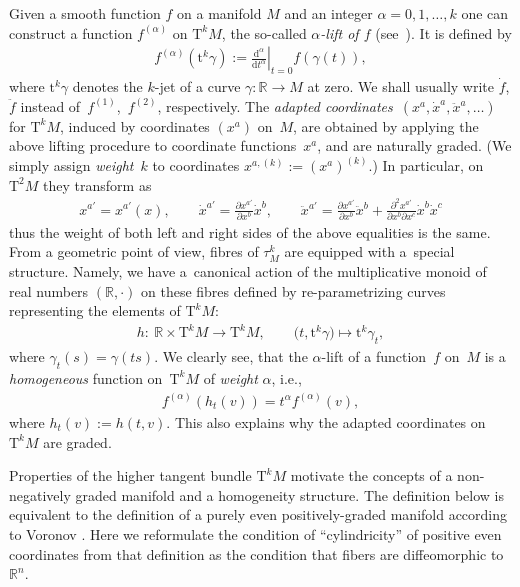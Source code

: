\documentclass[10pt,a4paper]{amsart}
\newcommand{\R}{\mathbb{R}}
\newcommand{\pa}{\partial}
\newcommand{\dd}{\mathrm{d}}
\newcommand{\ra}{\rightarrow}
\newcommand{\TT}[1]{\mathrm{T}^{#1}} %
\newcommand{\tclass}[2]{\bm{\mathrm{t}}^{#1}#2} %
\numberwithin{equation}{section}
\theoremstyle{definition}
\begin{document}
Given a smooth function $f$ on a manifold $M$ and an integer $\alpha=0,1,\hdots,k$ one can construct a function $f^{(\alpha)}$ on $\TT k M$, the so-called \emph{$\alpha$-lift of $f$} (see~\cite{Morimoto_Lifts}). It is defined by
\begin{gather*}
f^{(\alpha)}(\tclass{k}{\gamma}):= \left.\frac{\dd^\alpha}{\dd t^\alpha}\right|_{t=0} f(\gamma(t)),
\end{gather*}
where $\tclass{k}{\gamma}$ denotes the $k$-{jet} of a curve $\gamma\colon \R \ra M$ at zero. We shall usually write $\dot{f}$, $\ddot{f}$ instead of~$f^{(1)}$,~$f^{(2)}$, respectively. The \emph{adapted coordinates}~$(x^{a}, \dot{x}^a, \ddot{x}^a, \ldots)$ for $\TT{k} M$, induced by coordinates $(x^a)$ on~$M$, are obtained by applying the above lifting procedure to coordinate functions~$x^a$, and are naturally graded. (We simply assign \emph{weight}~$k$ to coordinates \mbox{$x^{a, (k)} := (x^a)^{(k)}$}.) In particular, on $\TT{2} M$ they transform as
\begin{gather}\label{e:T2M}
x^{a'}=x^{a'}(x), \qquad \dot{x}^{a'} = \frac{\partial x^{a'}}{\pa x^b} \dot{x}^b, \qquad
\ddot{x}^{a'} = \frac{\pa x^{a'}}{\pa x^b} \ddot{x}^b + \frac{\pa^2 x^{a'}}{\pa x^b\pa x^c}\dot{x}^b \dot{x}^c
\end{gather}
thus the weight of both left and right sides of the above equalities is the same. From a geo\-metric point of view, fibres of $\tau^k_M$ are equipped with a~special structure. Namely, we have a~canonical action of the multiplicative monoid of real numbers $(\R, \cdot)$ on these fibres defined by re-parametrizing curves representing the elements of $\TT{k} M$:
\begin{gather*}
h\colon \ \R \times \TT{k} M \ra \TT{k} M, \qquad \big(t, \tclass{k}{\gamma}\big) \mapsto \tclass{k}{\gamma_t},
\end{gather*}
where $\gamma_t(s)=\gamma(ts)$. We clearly see, that the $\alpha$-lift of a function~$f$ on~$M$ is a \emph{homogeneous} function on~$\TT{k} M$ of \emph{weight} $\alpha$, i.e.,{\samepage
\begin{gather*}
f^{(\alpha)}(h_t(v)) = t^\alpha f^{(\alpha)}(v),
\end{gather*}
where $h_t(v) := h(t, v)$. This also explains why the adapted coordinates on $\TT{k} M$ are graded.}

Properties of the higher tangent bundle $\TT{k} M$ motivate the concepts of a non-negatively graded manifold and a homogeneity structure. The definition below is equivalent to the definition of a purely even positively-graded manifold according to Voronov \cite[Definition~4.1]{Voronov_2002}. Here we reformulate the condition of ``cylindricity'' of positive even coordinates from that definition as the condition that fibers are diffeomorphic to~$\R^n$.
\end{document}
